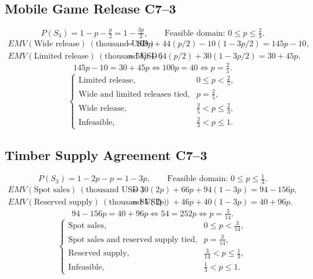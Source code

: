 {\subsection{Mobile Game Release \hfill C7--3}
\label{summary:mobile-game-release}
\[
P(S_3)=1-p-\tfrac p2=1-\tfrac{3p}{2},\qquad
\text{Feasible domain: }0\le p\le\tfrac23.
\]
\begin{align*}
EMV(\text{Wide release})\ (\text{thousand USD})
  &=108p+44(p/2)-10(1-3p/2)=145p-10,\\
EMV(\text{Limited release})\ (\text{thousand USD})
  &=58p+64(p/2)+30(1-3p/2)=30+45p.
\end{align*}
\[
145p-10=30+45p\iff100p=40\iff p=\tfrac25.
\]
\[
\boxed{\begin{cases}
\text{Limited release},&0\le p<\frac25,\\
\text{Wide and limited releases tied},&p=\frac25,\\
\text{Wide release},&\frac25<p\le\frac23,\\
\text{Infeasible},&\frac23<p\le1.
\end{cases}}
\]
\subsection{Timber Supply Agreement \hfill C7--3}
\label{summary:timber-supply-agreement}
\[
P(S_3)=1-2p-p=1-3p,\qquad
\text{Feasible domain: }0\le p\le\tfrac13.
\]
\begin{align*}
EMV(\text{Spot sales})\ (\text{thousand USD})
  &=30(2p)+66p+94(1-3p)=94-156p,\\
EMV(\text{Reserved supply})\ (\text{thousand USD})
  &=85(2p)+46p+40(1-3p)=40+96p.
\end{align*}
\[
94-156p=40+96p\iff54=252p\iff p=\tfrac3{14}.
\]
\[
\boxed{\begin{cases}
\text{Spot sales},&0\le p<\frac3{14},\\
\text{Spot sales and reserved supply tied},&p=\frac3{14},\\
\text{Reserved supply},&\frac3{14}<p\le\frac13,\\
\text{Infeasible},&\frac13<p\le1.
\end{cases}}
\]
}

